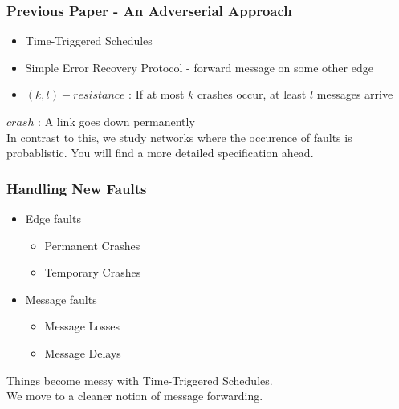 \documentclass{beamer}
\begin{document}
\begin{frame}
\frametitle{Previous Paper - An Adverserial Approach}
	\begin{itemize}
	\item Time-Triggered Schedules
	\item Simple Error Recovery Protocol - forward message on some other edge
	\item $(k,l)-resistance$ : If at most $k$ crashes occur, at least $l$ messages arrive\\[3ex]
	\end{itemize}
	\hspace*{20pt}$ crash $ : A link goes down permanently\\[3ex]
	\pause
	\color{blue}
	In contrast to this, we study networks where the occurence of faults is probablistic. You will find a more detailed specification ahead.
\end{frame}

\begin{frame}
\frametitle{Handling New Faults}
	\begin{itemize}
	\item Edge faults
	\begin{itemize}
		\item Permanent Crashes 
		\item Temporary Crashes
	\end{itemize}
	\item Message faults
	\begin{itemize}
		\item Message Losses
		\item Message Delays\\[2ex]
	\end{itemize}
	\end{itemize}
	\pause
	\begin{center}
	\color{red}
	Things become messy with Time-Triggered Schedules.\\We move to a cleaner notion of message forwarding.
	\end{center}
\end{frame}





\end{document}
